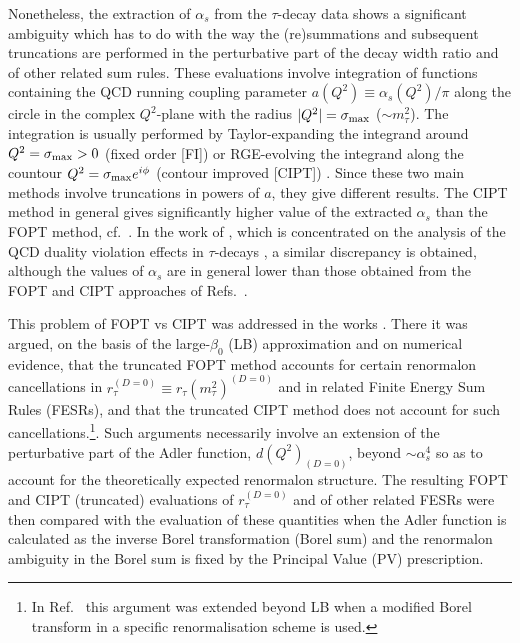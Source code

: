\documentclass[aps,nofootinbib,showkeys,noshowpacs,preprintnumbers,amsmath,amssymb]{revtex4}
\begin{document}
Nonetheless, the extraction of $\alpha_s$ from the $\tau$-decay data shows a significant ambiguity which has to do with the way the (re)summations and subsequent truncations are performed in the perturbative part of the decay width ratio and of other related sum rules. These evaluations involve integration of functions containing the QCD running coupling parameter $a(Q^2) \equiv \alpha_s(Q^2)/\pi$ along the circle in the complex $Q^2$-plane with the radius $|Q^2|=\sigma_{\rm max}$ ($\sim m^2_{\tau}$). The integration is usually performed by Taylor-expanding the integrand around $Q^2=\sigma_{\rm max} >0$ (fixed order [FI]) or RGE-evolving the integrand along the countour $Q^2=\sigma_{\rm max} e^{i \phi}$ (contour improved [CIPT]) \cite{CI1,CI2,CIAPT}. Since these two main methods involve truncations in powers of $a$, they give different results. The CIPT method in general gives significantly higher value of the extracted $\alpha_s$ than the FOPT method, cf.~\cite{BCK,Davetal,Pich}. In the work of \cite{Bo2015}, which is concentrated on the analysis of the QCD duality violation effects in $\tau$-decays \cite{Cata}, a similar discrepancy is obtained, although the values of $\alpha_s$ are in general lower than those obtained from the FOPT and CIPT approaches of Refs.~\cite{BCK,Davetal,Pich}.  

This problem of FOPT vs CIPT was addressed in the works \cite{BJ,BJ2}. There it was argued, on the basis of the large-$\beta_0$ (LB) approximation and on numerical evidence, that the truncated FOPT method accounts for certain renormalon cancellations in $r_{\tau}^{(D=0)} \equiv r_{\tau}(m_{\tau}^2)^{(D=0)}$ and in related Finite Energy Sum Rules (FESRs), and that the truncated CIPT method does not account for such cancellations.\footnote{In Ref.~\cite{BoiOl} this argument was extended beyond LB when a modified Borel transform in a specific renormalisation scheme is used.}. Such arguments necessarily involve an extension of the perturbative part of the Adler function, $d(Q^2)_{(D=0)}$, beyond $\sim \alpha_s^4$ so as to account for the theoretically expected renormalon structure. The resulting FOPT and CIPT (truncated) evaluations of $r_{\tau}^{(D=0)}$ and of other related FESRs were then compared with the evaluation of these quantities when the Adler function is calculated as the inverse Borel transformation (Borel sum) and the renormalon ambiguity in the Borel sum is fixed by the Principal Value (PV) prescription.
\end{document}
